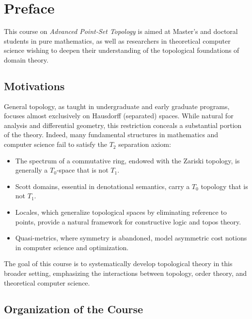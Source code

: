 \chapter*{Preface}

This course on \emph{Advanced Point-Set Topology} is aimed at Master's and doctoral
students in pure mathematics, as well as researchers in theoretical computer science
wishing to deepen their understanding of the topological foundations of domain theory.

\section*{Motivations}

General topology, as taught in undergraduate and early graduate programs, focuses almost
exclusively on Hausdorff (separated) spaces. While natural for analysis and differential
geometry, this restriction conceals a substantial portion of the theory. Indeed, many
fundamental structures in mathematics and computer science fail to satisfy the $T_2$
separation axiom:

\begin{itemize}
  \item The spectrum of a commutative ring, endowed with the Zariski topology, is
    generally a $T_0$-space that is not $T_1$.
  \item Scott domains, essential in denotational semantics, carry a $T_0$ topology
    that is not $T_1$.
  \item Locales, which generalize topological spaces by eliminating reference to points,
    provide a natural framework for constructive logic and topos theory.
  \item Quasi-metrics, where symmetry is abandoned, model asymmetric cost notions
    in computer science and optimization.
\end{itemize}

The goal of this course is to systematically develop topological theory in this broader
setting, emphasizing the interactions between topology, order theory, and theoretical
computer science.

\section*{Organization of the Course}

